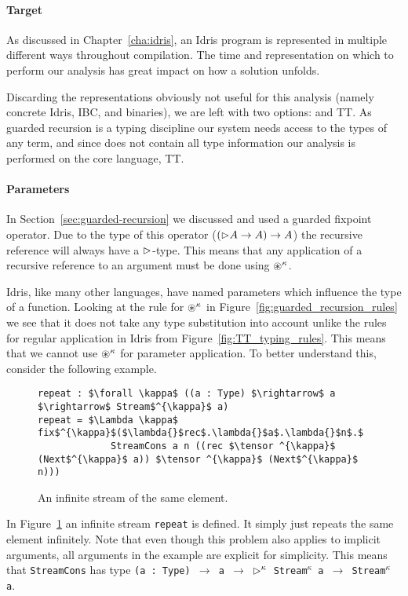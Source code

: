 \paragraph{Target}
As discussed in Chapter~\ref{cha:idris}, an Idris program is represented in
multiple different ways throughout compilation. The time and representation on
which to perform our analysis has great impact on how a solution
unfolds.

Discarding the representations obviously not useful for this analysis (namely
concrete Idris, IBC, and binaries), we are left with two options: \IdrisM and
TT. As guarded recursion is a typing discipline our system needs access to
the types of any term, and since \IdrisM does not contain all type information
our analysis is performed on the core language, TT.

\paragraph{Parameters}
In Section~\ref{sec:guarded-recursion} we discussed and used a guarded fixpoint
operator. Due to the type of this operator ($(\rhd A \rightarrow A)
\rightarrow A$) the recursive reference will always have a $\rhd$-type. This
means that any application of a recursive reference to an argument must be done
using $\circledast ^{\kappa}$.

Idris, like many other languages, have named parameters which influence the type
of a function. Looking at the rule for $\circledast ^{\kappa}$ in
Figure~\ref{fig:guarded_recursion_rules} we see that it does not take any type
substitution into account unlike the rules for regular application in Idris from
Figure~\ref{fig:TT_typing_rules}. This means that we cannot use $\circledast ^{\kappa}$ for
parameter application. To better understand this, consider the following example.

\begin{figure}[h]
  \begin{lstlisting}[mathescape]
repeat : $\forall \kappa$ ((a : Type) $\rightarrow$ a $\rightarrow$ Stream$^{\kappa}$ a)
repeat = $\Lambda \kappa$ fix$^{\kappa}$($\lambda{}$rec$.\lambda{}$a$.\lambda{}$n$.$ 
             StreamCons a n ((rec $\tensor ^{\kappa}$ (Next$^{\kappa}$ a)) $\tensor ^{\kappa}$ (Next$^{\kappa}$ n)))
\end{lstlisting}
  \caption{An infinite stream of the same element.}
  \label{fig:repeat_guarded_example}
\end{figure}

In Figure~\ref{fig:repeat_guarded_example} an infinite stream \texttt{repeat} is
defined. It simply just repeats the same element infinitely. Note that even
though this problem also applies to implicit arguments, all arguments in the
example are explicit for simplicity. This means that \texttt{StreamCons} has
type \texttt{(a : Type) $\rightarrow$ a $\rightarrow$ $\rhd^{\kappa}$ Stream$^{\kappa}$ a $\rightarrow$ Stream$^{\kappa}$ a}.

